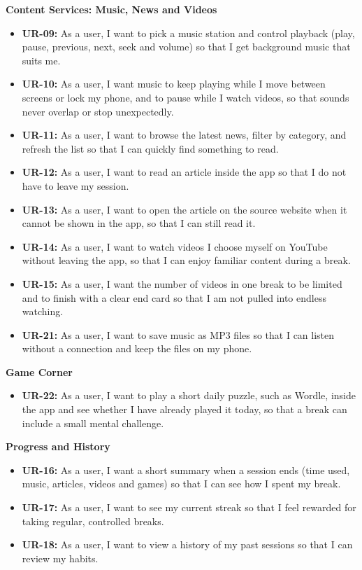 \medskip\noindent\textbf{Content Services: Music, News and Videos}\par\nopagebreak
\begin{itemize}
  \item \textbf{UR-09:} As a user, I want to pick a music station and control
        playback (play, pause, previous, next, seek and volume) so that I get
        background music that suits me.
  \item \textbf{UR-10:} As a user, I want music to keep playing while I move
        between screens or lock my phone, and to pause while I watch videos, so
        that sounds never overlap or stop unexpectedly.
  \item \textbf{UR-11:} As a user, I want to browse the latest news, filter by
        category, and refresh the list so that I can quickly find something to
        read.
  \item \textbf{UR-12:} As a user, I want to read an article inside the app so
        that I do not have to leave my session.
  \item \textbf{UR-13:} As a user, I want to open the article on the source
        website when it cannot be shown in the app, so that I can still read
        it.
  \item \textbf{UR-14:} As a user, I want to watch videos I choose myself on
        YouTube without leaving the app, so that I can enjoy familiar content
        during a break.
  \item \textbf{UR-15:} As a user, I want the number of videos in one break to
        be limited and to finish with a clear end card so that I am not pulled
        into endless watching.
  \item \textbf{UR-21:} As a user, I want to save music as MP3 files so that I
        can listen without a connection and keep the files on my phone.
\end{itemize}

\medskip\noindent\textbf{Game Corner}\par\nopagebreak
\begin{itemize}
  \item \textbf{UR-22:} As a user, I want to play a short daily puzzle, such
        as Wordle, inside the app and see whether I have already played it
        today, so that a break can include a small mental challenge.
\end{itemize}

\medskip\noindent\textbf{Progress and History}\par\nopagebreak
\begin{itemize}
  \item \textbf{UR-16:} As a user, I want a short summary when a session ends
        (time used, music, articles, videos and games) so that I can see how I
        spent my break.
  \item \textbf{UR-17:} As a user, I want to see my current streak so that I
        feel rewarded for taking regular, controlled breaks.
  \item \textbf{UR-18:} As a user, I want to view a history of my past sessions
        so that I can review my habits.
\end{itemize}

